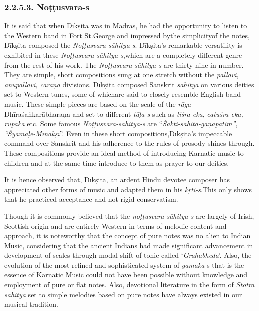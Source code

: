 \vspace{-.3cm}

\subsubsection*{2.2.5.3. Noṭṭusvara-s}

It is said that when Dīkṣita was in Madras, he had the opportunity to listen to the Western band in Fort St.George and impressed bythe simplicityof the notes, Dīkṣita composed the \textit{Noṭṭusvara-sāhitya-s}. Dīkṣita's remarkable versatility is exhibited in these \textit{Noṭṭusvara-sāhitya-s},\break which are a completely different genre from the rest of his work. The \textit{Noṭṭusvara-sāhitya-s} are thirty-nine in number. They are simple, short compositions sung at one stretch without the \textit{pallavi}, \textit{anupallavi, caraṇa} divisions. Dīkṣita composed Sanskrit \textit{sāhitya} on various deities set to Western tunes, some of whichare said to closely resemble English band music. These simple pieces are based on the scale of the \textit{rāga} Dhīra\-śaṅkarābharaṇa and set to different \textit{tāḷa-s} such as \textit{tiśra-eka}, \textit{catuśra-eka, rūpaka} etc. Some famous \textit{Noṭṭusvara-sāhitya-s} are “\textit{Śakti-sahita-gaṇapatim”}, \textit{“Śyāmaḷe-Mīnākṣī}”. Even in these short compositions,\break Dīkṣita's impeccable command over Sanskrit and his adherence to the rules of prosody shines through. These compositions provide an ideal method of introducing Karnatic music to children and at the same time introduce to them as prayer to our deities.

It is hence observed that, Dīkṣita, an ardent Hindu devotee composer has appreciated other forms of music and adapted them in his \textit{kṛti-s}.\break This only shows that he practiced acceptance and not rigid conservatism.

Though it is commonly believed that the \textit{noṭṭusvara-sāhitya-s} are largely of Irish, Scottish origin and are entirely Western in terms of melodic content and approach, it is noteworthy that the concept of pure notes was no alien to Indian Music, considering that the ancient Indians had made significant advancement in development of scales through modal shift of tonic called ‘\textit{Grahabheda}’. Also, the evolution of the most refined and sophisticated system of \textit{gamaka}-s that is the essence of Karnatic Music could not have been possible without knowledge and employment of pure or flat notes. Also, devotional literature in the form of \textit{Stotra sāhitya} set to simple melodies based on pure notes have always existed in our musical tradition.

